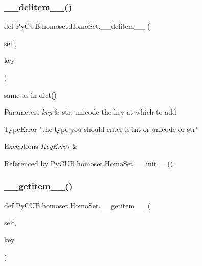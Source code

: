 \subsubsection{\texorpdfstring{\+\_\+\+\_\+delitem\+\_\+\+\_\+()}{\_\_delitem\_\_()}}
{\footnotesize\ttfamily def Py\+C\+U\+B.\+homoset.\+Homo\+Set.\+\_\+\+\_\+delitem\+\_\+\+\_\+ (\begin{DoxyParamCaption}\item[{}]{self,  }\item[{}]{key }\end{DoxyParamCaption})}



same as in dict() 


\begin{DoxyParams}{Parameters}
{\em key} & str, unicode the key at which to add\\
\hline
\end{DoxyParams}
\begin{DoxyVerb}        TypeError "the type you should enter is int or unicode or str"
\end{DoxyVerb}
 
\begin{DoxyExceptions}{Exceptions}
{\em Key\+Error} & \\
\hline
\end{DoxyExceptions}


Referenced by Py\+C\+U\+B.\+homoset.\+Homo\+Set.\+\_\+\+\_\+init\+\_\+\+\_\+().

\mbox{\label{class_py_c_u_b_1_1homoset_1_1_homo_set_ab7ac33ea3033b440816e179cb4a5e3c0}} 
\subsubsection{\texorpdfstring{\+\_\+\+\_\+getitem\+\_\+\+\_\+()}{\_\_getitem\_\_()}}
{\footnotesize\ttfamily def Py\+C\+U\+B.\+homoset.\+Homo\+Set.\+\_\+\+\_\+getitem\+\_\+\+\_\+ (\begin{DoxyParamCaption}\item[{}]{self,  }\item[{}]{key }\end{DoxyParamCaption})}



